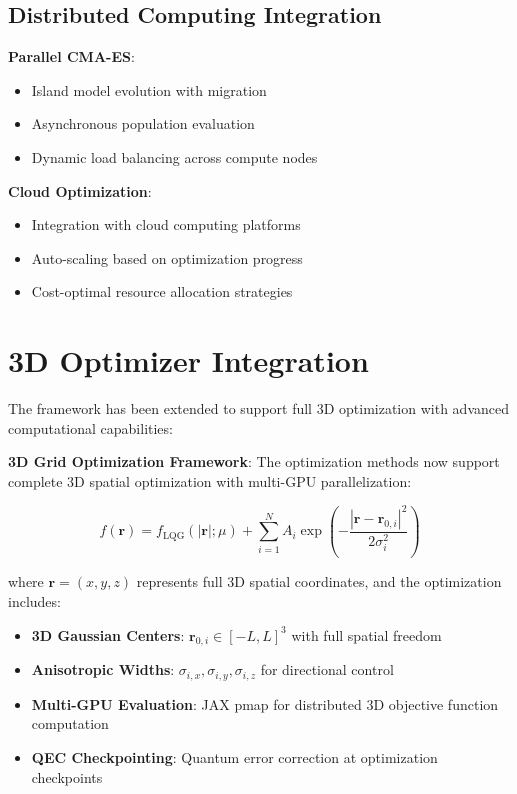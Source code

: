 \documentclass[11pt,a4paper]{article}
\begin{document}
\subsection{Distributed Computing Integration}

\textbf{Parallel CMA-ES}:
\begin{itemize}
\item Island model evolution with migration
\item Asynchronous population evaluation
\item Dynamic load balancing across compute nodes
\end{itemize}

\textbf{Cloud Optimization}:
\begin{itemize}
\item Integration with cloud computing platforms
\item Auto-scaling based on optimization progress
\item Cost-optimal resource allocation strategies
\end{itemize}

\section{3D Optimizer Integration}

The framework has been extended to support full 3D optimization with advanced computational capabilities:

\textbf{3D Grid Optimization Framework}:
The optimization methods now support complete 3D spatial optimization with multi-GPU parallelization:

\begin{equation}
f(\mathbf{r}) = f_{\text{LQG}}(|\mathbf{r}|; \mu) + \sum_{i=1}^{N} A_i \exp\left(-\frac{|\mathbf{r} - \mathbf{r}_{0,i}|^2}{2\sigma_i^2}\right)
\end{equation}

where $\mathbf{r} = (x, y, z)$ represents full 3D spatial coordinates, and the optimization includes:
\begin{itemize}
\item \textbf{3D Gaussian Centers}: $\mathbf{r}_{0,i} \in [-L, L]^3$ with full spatial freedom
\item \textbf{Anisotropic Widths}: $\sigma_{i,x}, \sigma_{i,y}, \sigma_{i,z}$ for directional control
\item \textbf{Multi-GPU Evaluation}: JAX pmap for distributed 3D objective function computation
\item \textbf{QEC Checkpointing}: Quantum error correction at optimization checkpoints
\end{itemize}
\end{document}
